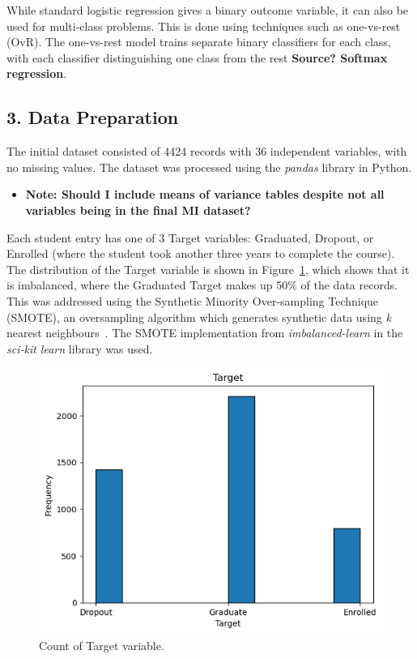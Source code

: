 \documentclass[12pt]{article}
\begin{document}
While standard logistic regression gives a binary outcome variable, it can also be used for multi-class problems. This is done using techniques such as one-vs-rest (OvR). The one-vs-rest model trains separate binary classifiers for each class, with each classifier distinguishing one class from the rest \textbf{Source? Softmax regression}.

\newpage
\subsection*{3. Data Preparation}
The initial dataset consisted of 4424 records with 36 independent variables, with no missing values. The dataset was processed using the \textit{pandas} library in Python.

\begin{itemize}
    \item{\textbf{Note: Should I include means of variance tables despite not all variables being in the final MI dataset?}}
\end{itemize}

Each student entry has one of 3 Target variables: Graduated, Dropout, or Enrolled (where the student took another three years to complete the course). The distribution of the Target variable is shown in Figure~\ref{fig:target}, which shows that it is imbalanced, where the Graduated Target makes up 50\% of the data records. This was addressed using the Synthetic Minority Over-sampling Technique (SMOTE), an oversampling algorithm which generates synthetic data using \textit{k} nearest neighbours~\cite{smote}. The SMOTE implementation from \textit{imbalanced-learn} in the \textit{sci-kit learn} library was used.

\begin{figure} [H]
    \centering
    \includegraphics[width=0.8\linewidth]{target_plot}
    \caption{Count of Target variable.}\label{fig:target}
  \end{figure}  
\end{document}
